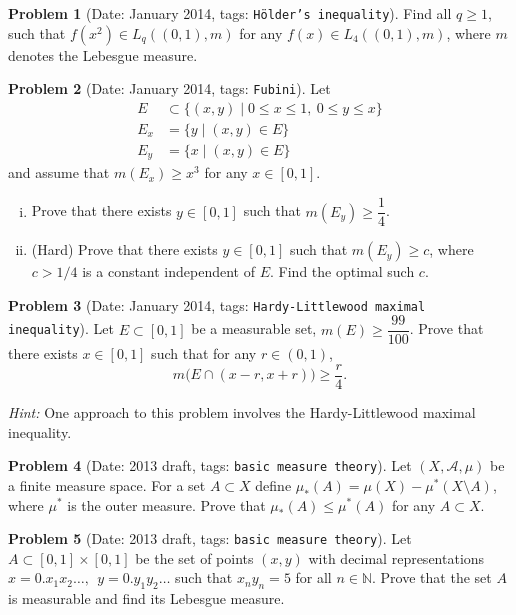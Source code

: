 \documentclass[11pt, notitlepage]{article}
\theoremstyle{definition}
\theoremstyle{definition}
\theoremstyle{definition}
\newtheorem{probstate}{Problem}
\theoremstyle{remark}
\newenvironment{problem}[2]{
    \begin{probstate}[Date: #1, tags: \texttt{#2}]
}
{
  \end{probstate}
}
\newcommand{\N}{\mathbb{N}}
\begin{document}
\begin{problem}{January 2014}{H\"older's inequality}
Find all $q \ge 1$, such that $f(x^2) \in L_q((0,1),m)$ for any $f(x)  \in L_4((0,1),m)$, where $m$ denotes the Lebesgue measure.
\end{problem}

\begin{problem}{January 2014}{Fubini}
Let 
\begin{align*}
E &\subset \{(x,y) \mid 0 \le x \le 1, \ 0 \le y \le x\}\\
E_x &= \{y\mid (x,y)\in E\}\\
E_y &= \{x\mid (x,y)\in E\}
\end{align*}
and assume that $m(E_x) \ge x^3$ for any $x \in [0,1]$.  
\begin{enumerate}[(i)]
 \item Prove that there exists $y \in [0,1]$ such that $m(E_y) \ge \dfrac{1}{4}$.
 \item (Hard) Prove that there exists $y \in [0,1]$ such that $m(E_y) \ge c$, where $c>1/4$ is a constant independent of $E$. Find the optimal such $c$. 
\end{enumerate}
\end{problem}

\begin{problem}{January 2014}{Hardy-Littlewood maximal inequality}
Let $E \subset [0,1]$ be a measurable set, $m(E) \ge \dfrac{99}{100}$. Prove that there exists $x \in [0,1]$ such that for any $r \in (0,1)$,
    \[
      m \big( E \cap (x-r,x+r) \big) \ge \frac{r}{4}.
    \]

\emph{Hint:} One approach to this problem involves the Hardy-Littlewood maximal inequality.
\end{problem}

\begin{problem}{2013 draft}{basic measure theory}
Let $(X, \mathcal{A},\mu)$ be a finite measure space. For a set $A \subset X$ define $\mu_*(A)=\mu(X)-\mu^*(X \setminus A)$, where $\mu^*$ is the outer measure. Prove that $\mu_*(A) \le \mu^*(A)$ for any $A \subset X$.
\end{problem}

\begin{problem}{2013 draft}{basic measure theory}
Let $A \subset [0,1] \times [0,1]$ be the set of points $(x,y)$ with decimal representations $x=0.x_1 x_2 \ldots, \ \  y=0.y_1 y_2 \ldots$ such that  $x_n y_n=5$ for all $n \in \N$. Prove that the set $A$ is measurable and find its Lebesgue measure.
\end{problem}
\end{document}

